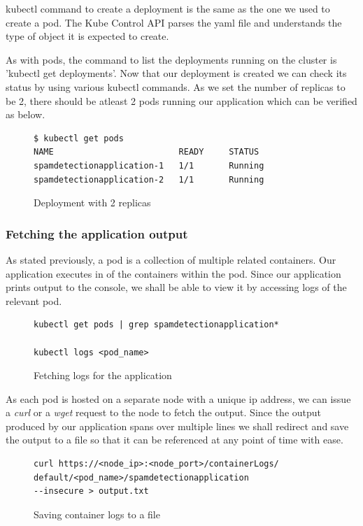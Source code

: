 \documentclass[9pt,twocolumn,twoside]{../../styles/osajnl}
\begin{document}
{\noindent
kubectl command to create a deployment is the same as the one we used
to create a pod. The Kube Control API parses the yaml file and
understands the type of object it is expected to create.

\noindent
As with pods, the command to list the deployments running on the
cluster is 'kubectl get deployments'. Now that our deployment is
created we can check its status by using various kubectl commands. As
we set the number of replicas to be 2, there should be atleast 2 pods
running our application which can be verified as below.

\begin{figure}[H]
\begin{verbatim}
$ kubectl get pods
NAME                         READY     STATUS        
spamdetectionapplication-1   1/1       Running  
spamdetectionapplication-2   1/1       Running
\end{verbatim}
\caption{Deployment with 2 replicas}
\label{Deployment with 2 replicas}
\end{figure}

\subsubsection{Fetching the application output}
As stated previously, a pod is a collection of multiple related
containers. Our application executes in of the containers within the
pod. Since our application prints output to the console, we shall be
able to view it by accessing logs of the relevant pod.

\begin{figure}[H]
\begin{verbatim}
kubectl get pods | grep spamdetectionapplication*

kubectl logs <pod_name>
\end{verbatim}
\caption{Fetching logs for the application}
\vspace{-4mm}
\label{Fetching logs for the application}
\end{figure}

\noindent
As each pod is hosted on a separate node with a unique ip address, we
can issue a \emph{curl} or a \emph{wget} request to the node to fetch
the output.  Since the output produced by our application spans over
multiple lines we shall redirect and save the output to a file so that
it can be referenced at any point of time with ease.
\begin{figure}[H]
\begin{verbatim}
curl https://<node_ip>:<node_port>/containerLogs/
default/<pod_name>/spamdetectionapplication 
--insecure > output.txt
\end{verbatim}
\caption{Saving container logs to a file}
\vspace{-4mm}
\label{Saving container logs to a file}
\end{figure}

}
\end{document}
